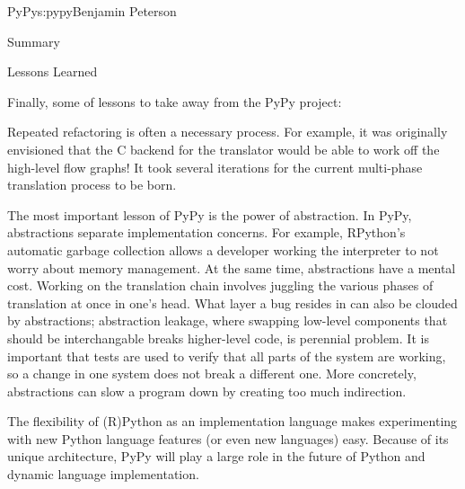 \begin{aosachapter}{PyPy}{s:pypy}{Benjamin Peterson}
\begin{aosasect1}{Summary}
\end{aosasect1}

\begin{aosasect1}{Lessons Learned}

Finally, some of lessons to take away from the PyPy project:

Repeated refactoring is often a necessary process. For example, it was
originally envisioned that the C backend for the translator would be able to
work off the high-level flow graphs! It took several iterations for the
current multi-phase translation process to be born.

The most important lesson of PyPy is the power of abstraction. In PyPy,
abstractions separate implementation concerns. For example, RPython's automatic
garbage collection allows a developer working the interpreter to not worry about
memory management. At the same time, abstractions have a mental cost. Working on
the translation chain involves juggling the various phases of translation at
once in one's head. What layer a bug resides in can also be clouded by
abstractions; abstraction leakage, where swapping low-level components that
should be interchangable breaks higher-level code, is perennial problem. It is
important that tests are used to verify that all parts of the system are working, so
a change in one system does not break a different one. More concretely,
abstractions can slow a program down by creating too much indirection.

The flexibility of (R)Python as an implementation language makes experimenting
with new Python language features (or even new languages) easy. Because of its
unique architecture, PyPy will play a large role in the future of Python and
dynamic language implementation.

\end{aosasect1}

\end{aosachapter}

